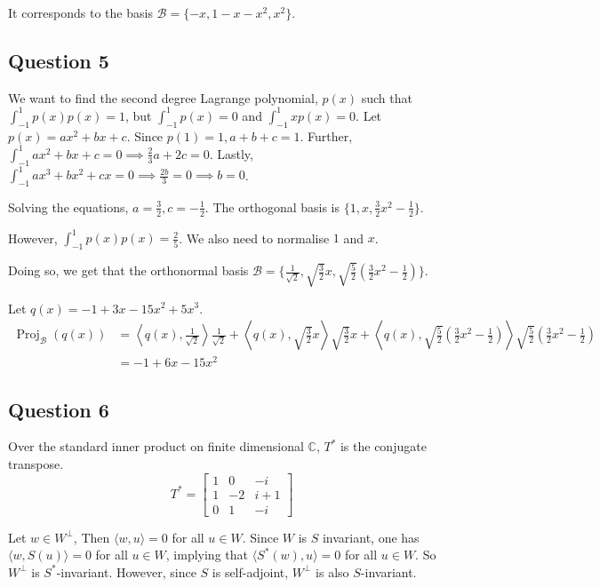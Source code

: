 \documentclass{article}
\DeclareMathOperator{\pro}{Proj}
\begin{document}
It corresponds to the basis $\mathscr B = \{-x, 1-x-x^2, x^2\}$.

\subsection*{Question 5}
We want to find the second degree Lagrange polynomial, $p(x)$ such that $\int_{-1}^1 p(x) p(x) = 1$, but $\int_{-1}^1 p(x) = 0$ and $\int_{-1}^1 xp(x) = 0$. Let $p(x)=ax^2+bx+c$. Since $p(1)=1, a+b+c=1$. Further, $\int_{-1}^1 ax^2+bx+c = 0 \implies \frac{2}{3}a+2c=0$. Lastly, $\int_{-1}^1 ax^3+bx^2+cx = 0 \implies \frac{2b}{3}=0 \implies b=0$.

Solving the equations, $a=\frac{3}{2}, c=-\frac{1}{2}$. The orthogonal basis is $\{1,x,\frac{3}{2}x^2-\frac{1}{2}\}$.

However, $\int_{-1}^1 p(x) p(x) = \frac{2}{5}$. We also need to normalise $1$ and $x$. 

Doing so, we get that the orthonormal basis $\mathscr B = \{\frac{1}{\sqrt{2}}, \sqrt{\frac{3}{2}}x, \sqrt{\frac{5}{2}}(\frac{3}{2}x^2 - \frac{1}{2})\}$.

Let $q(x)= -1+3x-15x^2+5x^3$. 
\begin{align*}
    \pro_{\mathscr{B}}(q(x)) &= \left \langle q(x), \frac{1}{\sqrt{2}} \right \rangle \frac{1}{\sqrt{2}}  + \left \langle q(x), \sqrt{\frac{3}{2}}x \right \rangle  \sqrt{\frac{3}{2}}x + \left \langle q(x),\sqrt{\frac{5}{2}}\left(\frac{3}{2}x^2 - \frac{1}{2}\right) \right \rangle \sqrt{\frac{5}{2}}\left(\frac{3}{2}x^2 - \frac{1}{2}\right) \\
    &= -1+6x-15x^2
\end{align*}

\subsection*{Question 6}
Over the standard inner product on finite dimensional $\mathbb{C}$, $T^*$ is the conjugate transpose. 
$$T^* = \left[\begin{array}{rrr}
1 & 0 & -i \\
1 & -2 & i + 1 \\
0 & 1 & -i
\end{array}\right]
$$

Let $w \in W^{\bot}$, Then $\langle w,u \rangle=0$ for all $u \in W$. Since $W$ is $S$ invariant, one has $\langle w, S(u) \rangle=0$ for all $u \in W$, implying that $\langle S^*(w), u \rangle=0$ for all $u \in W$. So $W^{\bot}$ is $S^*$-invariant. However, since $S$ is self-adjoint, $W^{\bot}$ is also $S$-invariant.
\end{document}
